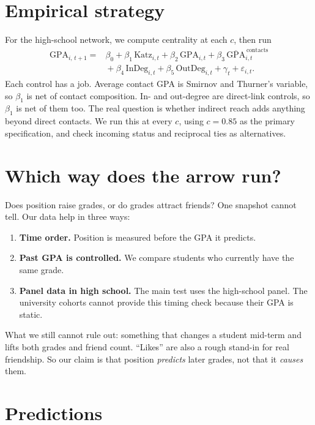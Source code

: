 \documentclass[11pt]{article}
\begin{document}
\section*{Empirical strategy}

For the high-school network, we compute centrality at each $c$, then run
\[
\begin{aligned}
\mathrm{GPA}_{i,\,t+1} = {}& \beta_0 + \beta_1\,\mathrm{Katz}_{i,t}
  + \beta_2\,\mathrm{GPA}_{i,t}
  + \beta_3\,\overline{\mathrm{GPA}}^{\,\text{contacts}}_{i,t} \\[2pt]
  & {} + \beta_4\,\mathrm{InDeg}_{i,t} + \beta_5\,\mathrm{OutDeg}_{i,t}
  + \gamma_t + \varepsilon_{i,t}.
\end{aligned}
\]
Each control has a job. Average contact GPA is Smirnov and Thurner's variable, so
$\beta_1$ is net of contact composition. In- and out-degree are direct-link controls,
so $\beta_1$ is net of them too. The real question is whether indirect reach adds
anything beyond direct contacts. We run this at every $c$, using $c = 0.85$ as the
primary specification, and check incoming status and reciprocal ties as alternatives.

\section*{Which way does the arrow run?}

Does position raise grades, or do grades attract friends? One snapshot cannot tell. Our
data help in three ways:
\begin{enumerate}
  \item \textbf{Time order.} Position is measured before the GPA it predicts.
  \item \textbf{Past GPA is controlled.} We compare students who currently have the same
        grade.
  \item \textbf{Panel data in high school.} The main test uses the high-school
        panel. The university cohorts cannot provide this timing check because their
        GPA is static.
\end{enumerate}
What we still cannot rule out: something that changes a student mid-term and lifts both
grades and friend count. ``Likes'' are also a rough stand-in for real friendship. So
our claim is that position \emph{predicts} later grades, not that it \emph{causes}
them.

\section*{Predictions}
\end{document}
